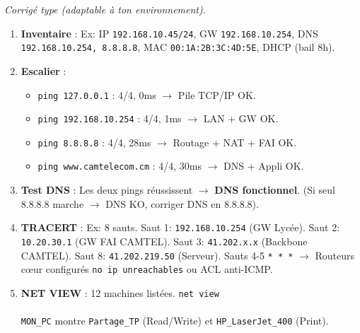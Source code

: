 \documentclass[11pt]{article}
\begin{document}
\begin{corrige}
\textit{Corrigé type (adaptable à ton environnement).}
\begin{enumerate}
\item \textbf{Inventaire} : Ex: IP \texttt{192.168.10.45/24}, GW \texttt{192.168.10.254}, DNS \texttt{192.168.10.254, 8.8.8.8}, MAC \texttt{00:1A:2B:3C:4D:5E}, DHCP (bail 8h).
\item \textbf{Escalier} :
      \begin{itemize}
      \item \texttt{ping 127.0.0.1} : 4/4, 0ms $\rightarrow$ Pile TCP/IP OK.
      \item \texttt{ping 192.168.10.254} : 4/4, 1ms $\rightarrow$ LAN + GW OK.
      \item \texttt{ping 8.8.8.8} : 4/4, 28ms $\rightarrow$ Routage + NAT + FAI OK.
      \item \texttt{ping www.camtelecom.cm} : 4/4, 30ms $\rightarrow$ DNS + Appli OK.
      \end{itemize}
\item \textbf{Test DNS} : Les deux pings réussissent $\rightarrow$ \textbf{DNS fonctionnel}. (Si seul 8.8.8.8 marche $\rightarrow$ DNS KO, corriger DNS en 8.8.8.8).
\item \textbf{TRACERT} : Ex: 8 sauts. Saut 1: \texttt{192.168.10.254} (GW Lycée). Saut 2: \texttt{10.20.30.1} (GW FAI CAMTEL). Saut 3: \texttt{41.202.x.x} (Backbone CAMTEL). Saut 8: \texttt{41.202.219.50} (Serveur). Sauts 4-5 \texttt{* * *} $\rightarrow$ Routeurs cœur configurés \texttt{no ip unreachables} ou ACL anti-ICMP.
\item \textbf{NET VIEW} : 12 machines listées. \texttt{net view \\\\MON\_PC} montre \texttt{Partage\_TP} (Read/Write) et \texttt{HP\_LaserJet\_400} (Print).
\end{enumerate}
\end{corrige}
\end{document}
